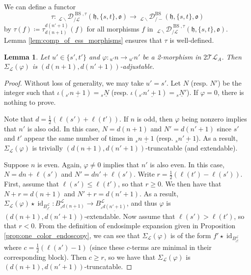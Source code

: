 \documentclass{amsart}
\newcommand{\scrL}{\mathcal{L}}
\DeclareMathOperator{\id}{id}
\newcommand{\fr}[1]{\mathfrak{#1}}
\DeclareMathOperator{\BS}{BS}
\newcommand{\TLcat}{2\mathcal{T}\mathcal{L}}
\newcommand{\EWmon}[2]{\:_{#1 \backslash} \mathcal{D}_{/ #2} }
\newtheorem{lemma}[subsubsection]{Lemma}
\theoremstyle{definition}
\numberwithin{equation}{subsection}
\begin{document}
We can define a functor
\[\tau : \EWmon{\scrL}{\scrL}^{\BS, \tau} (\fr{h}, \{s,t\}, \fr{o}) \to \EWmon{\scrL}{-}^{\BS} (\fr{h}, \{s,t\}, \fr{o})\]
by $\tau (f) \coloneq \tau_{d(n+1)}^{d(n'+1)} (f)$ for all morphisms $f$ in $\EWmon{\scrL}{\scrL}^{\BS, \tau} (\fr{h}, \{s,t\}, \fr{o})$. 
Lemma \ref{lem:comp_of_ess_morphisms} ensures that $\tau$ is well-defined.

\begin{lemma}\label{lem:truncations_and_extensions}
    Let $u' \in \{s',t'\}$ and $\varphi : {}_{u'} n \to {}_{u'} n'$ be a 2-morphism in $\TLcat_A$.
    Then $\Sigma_{\scrL} (\varphi)$ is $(d(n+1), d(n'+1))$-adjustable.
\end{lemma}
\begin{proof}
    Without loss of generality, we may take $u' = s'$.
    Let $N$ (resp. $N'$) be the integer such that $\iota ({}_{s'} \underline{n+1}) = {}_s \underline{N}$ (resp. $\iota ({}_{s'} \underline{n'+1}) = {}_s \underline{N}'$).
    If $\varphi = 0$, there is nothing to prove.

    Note that $d = \frac{1}{2} (\ell (s') + \ell (t'))$.
    If $n$ is odd, then $\varphi$ being nonzero implies that $n'$ is also odd.
    In this case, $N = d(n+1)$ and $N' = d(n'+1)$ since $s'$ and $t'$ appear the same number of times in ${}_s \underline{n+1}$ (resp. ${}_s \underline{n'+1}$).
    As a result, $\Sigma_{\scrL} (\varphi)$ is trivially $(d(n+1), d(n'+1))$-truncatable (and extendable).

    Suppose $n$ is even. Again, $\varphi \neq 0$ implies that $n'$ is also even.
    In this case, $N = dn + \ell (s')$ and $N' = dn' + \ell (s')$.
    Write $r = \frac{1}{2} (\ell (t') - \ell (s'))$.
    First, assume that $\ell (s') \leq \ell (t')$, so that $r \geq 0$.
    We then have that $N + r = d (n+1)$ and $N' + r = d(n'+1)$.
    As a result, $\Sigma_{\scrL} (\varphi) \star \id_{B_{{}_t \underline{r}}^{\scrL}} : B_{{}_s \underline{d(n+1)}}^{\scrL} \to  B_{{}_s \underline{d(n'+1)}}^{\scrL}$, and thus $\varphi$ is $(d(n+1), d(n'+1))$-extendable. 
    Now assume that $\ell (s') > \ell (t')$, so that $r < 0$.
    From the definition of endosimple expansion given in Proposition \ref{prop:one_color_endoscopy}, we can see that $\Sigma_{\scrL} (\varphi)$ is of the form $f' \star \id_{B_{{}_t \underline{c}}^{\scrL}}$ where $c = \frac{1}{2} (\ell (s') - 1)$ (since these $c$-terms are minimal in their corresponding block).
    Then $c \geq r$, so we have that $\Sigma_{\scrL} (\varphi)$ is $(d(n+1), d(n'+1))$-truncatable.
\end{proof}
\end{document}
